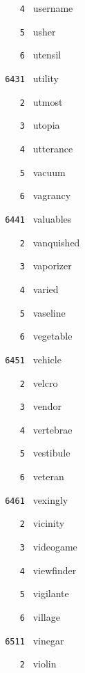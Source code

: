 \documentclass[11pt]{article}
\begin{document}
\begin{multicols}{6}
\noindent \texttt{ \ \ \ 4 } username  \par
\noindent \texttt{ \ \ \ 5 } usher  \par
\noindent \texttt{ \ \ \ 6 } utensil  \par
\vspace{3mm}
\noindent \texttt{ 6431 } utility  \par
\noindent \texttt{ \ \ \ 2 } utmost  \par
\noindent \texttt{ \ \ \ 3 } utopia  \par
\noindent \texttt{ \ \ \ 4 } utterance  \par
\noindent \texttt{ \ \ \ 5 } vacuum  \par
\noindent \texttt{ \ \ \ 6 } vagrancy  \par
\vspace{3mm}
\noindent \texttt{ 6441 } valuables  \par
\noindent \texttt{ \ \ \ 2 } vanquished  \par
\noindent \texttt{ \ \ \ 3 } vaporizer  \par
\noindent \texttt{ \ \ \ 4 } varied  \par
\noindent \texttt{ \ \ \ 5 } vaseline  \par
\noindent \texttt{ \ \ \ 6 } vegetable  \par
\vspace{3mm}
\noindent \texttt{ 6451 } vehicle  \par
\noindent \texttt{ \ \ \ 2 } velcro  \par
\noindent \texttt{ \ \ \ 3 } vendor  \par
\noindent \texttt{ \ \ \ 4 } vertebrae  \par
\noindent \texttt{ \ \ \ 5 } vestibule  \par
\noindent \texttt{ \ \ \ 6 } veteran  \par
\vspace{3mm}
\noindent \texttt{ 6461 } vexingly  \par
\noindent \texttt{ \ \ \ 2 } vicinity  \par
\noindent \texttt{ \ \ \ 3 } videogame  \par
\noindent \texttt{ \ \ \ 4 } viewfinder  \par
\noindent \texttt{ \ \ \ 5 } vigilante  \par
\noindent \texttt{ \ \ \ 6 } village  \par
\noindent \texttt{ 6511 } vinegar  \par
\noindent \texttt{ \ \ \ 2 } violin  \par

\end{multicols}
\end{document}
